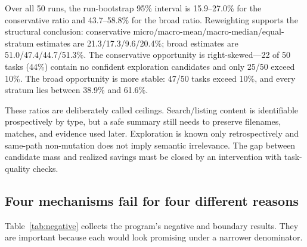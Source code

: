 \documentclass[10pt,twocolumn]{article}
\begin{document}
Over all 50 runs, the run-bootstrap 95\% interval is 15.9--27.0\% for the conservative ratio and
43.7--58.8\% for the broad ratio.  Reweighting supports the structural conclusion: conservative
micro/macro-mean/macro-median/equal-stratum estimates are 21.3/17.3/9.6/20.4\%; broad estimates are
51.0/47.4/44.7/51.3\%.  The conservative opportunity is right-skewed---22 of 50 tasks (44\%) contain no
confident exploration candidates and only 25/50 exceed 10\%.  The broad opportunity is more stable:
47/50 tasks exceed 10\%, and every stratum lies between 38.9\% and 61.6\%.

These ratios are deliberately called ceilings.  Search/listing content is identifiable prospectively
by type, but a safe summary still needs to preserve filenames, matches, and evidence used later.
Exploration is known only retrospectively and same-path non-mutation does not imply semantic
irrelevance.  The gap between candidate mass and realized savings must be closed by an intervention
with task-quality checks.


\subsection{Four mechanisms fail for four different reasons}

Table~\ref{tab:negative} collects the program's negative and boundary results.  They are important
because each would look promising under a narrower denominator.
\end{document}
